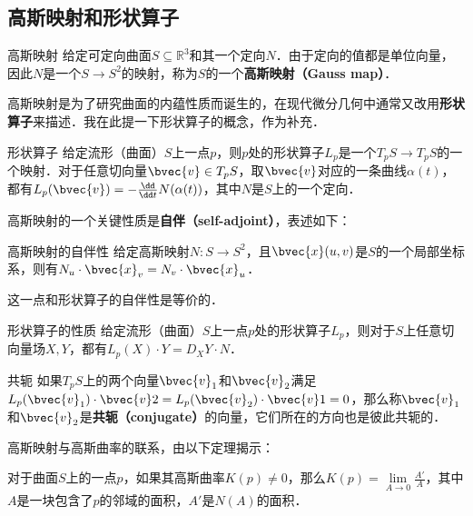 
\subsection{高斯映射和形状算子}
\begin{definition}{高斯映射}
给定可定向曲面$S\subseteq\mathbb{R}^3$和其一个定向$N$．由于定向的值都是单位向量，因此$N$是一个$S\to S^2$的映射，称为$S$的一个\textbf{高斯映射（Gauss map）}．
\end{definition}

高斯映射是为了研究曲面的内蕴性质而诞生的，在现代微分几何中通常又改用\textbf{形状算子}来描述．我在此提一下形状算子的概念，作为补充．

\begin{definition}{形状算子}
给定流形（曲面）$S$上一点$p$，则$p$处的形状算子$L_p$是一个$T_pS\to T_pS$的一个映射．对于任意切向量$\bvec{v}\in T_pS$，取$\bvec{v}$对应的一条曲线$\alpha(t)$，都有$L_p(\bvec{v})=-\frac{\dd}{\dd t}N(\alpha(t))$，其中$N$是$S$上的一个定向．
\end{definition}


高斯映射的一个关键性质是\textbf{自伴（self-adjoint）}，表述如下：

\begin{theorem}{高斯映射的自伴性}
给定高斯映射$N:S\to S^2$，且$\bvec{x}(u, v)$是$S$的一个局部坐标系，则有$N_u\cdot \bvec{x}_v=N_v\cdot \bvec{x}_u$．
\end{theorem}

这一点和形状算子的自伴性是等价的．

\begin{theorem}{形状算子的性质}
给定流形（曲面）$S$上一点$p$处的形状算子$L_p$，则对于$S$上任意切向量场$X, Y$，都有$L_p(X)\cdot Y=D_XY\cdot N$．
\end{theorem}


\begin{definition}{共轭}
如果$T_pS$上的两个向量$\bvec{v}_1$和$\bvec{v}_2$满足$L_p(\bvec{v}_1)\cdot \bvec{v}2=L_p(\bvec{v}_2)\cdot \bvec{v}1=0$，那么称$\bvec{v}_1$和$\bvec{v}_2$是\textbf{共轭（conjugate）}的向量，它们所在的方向也是彼此共轭的．
\end{definition}

高斯映射与高斯曲率的联系，由以下定理揭示：

\begin{theorem}{}
对于曲面$S$上的一点$p$，如果其高斯曲率$K(p)\not=0$，那么$K(p)=\lim\limits_{A\to 0}\frac{A'}{A}$，其中$A$是一块包含了$p$的邻域的面积，$A'$是$N(A)$的面积．
\end{theorem}

